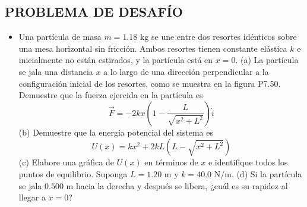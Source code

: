 \documentclass[11pt,a4paper]{article}
\begin{document}
\newpage

\subsection*{PROBLEMA DE DESAFÍO}

\begin{itemize}
    \item[\textbf{50.}] Una partícula de masa $m = 1.18 \text{ kg}$ se une entre dos resortes idénticos sobre una mesa horizontal sin fricción. Ambos resortes tienen constante elástica $k$ e inicialmente no están estirados, y la partícula está en $x = 0$. (a) La partícula se jala una distancia $x$ a lo largo de una dirección perpendicular a la configuración inicial de los resortes, como se muestra en la figura P7.50. Demuestre que la fuerza ejercida en la partícula es
    $$ \vec{F} = -2kx \left( 1 - \frac{L}{\sqrt{x^2 + L^2}} \right)\hat{i} $$
    (b) Demuestre que la energía potencial del sistema es
    $$ U(x) = kx^2 + 2kL(L - \sqrt{x^2 + L^2}) $$
    (c) Elabore una gráfica de $U(x)$ en términos de $x$ e identifique todos los puntos de equilibrio. Suponga $L = 1.20 \text{ m}$ y $k = 40.0 \text{ N/m}$. (d) Si la partícula se jala $0.500 \text{ m}$ hacia la derecha y después se libera, ¿cuál es su rapidez al llegar a $x = 0$?
    \vspace*{9cm}
\end{itemize}
\end{document}
